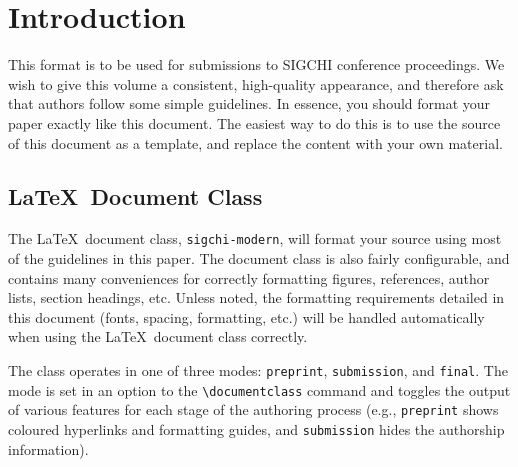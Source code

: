 \documentclass[preprint]{../latex/sigchi-modern}
\begin{document}
\maketitle

\begin{abstract}
This paper describes the formatting requirements for SIGCHI Conference
Proceedings and a few recommendations on writing for the worldwide SIGCHI
readership. This paper is also the documentation for the \LaTeX\ class
for producing formatted papers.
(This paper is not produced by SIGCHI, nor is it an authoritative source for
the described formatting.)
\end{abstract}



\section{Introduction}
This format is to be used for submissions to SIGCHI conference proceedings. We
wish to give this volume a consistent, high-quality appearance, and therefore
ask that authors follow some simple guidelines. In essence, you should format
your paper exactly like this document. The easiest way to do this is to use the
source of this document as a template, and replace the content with your own
material.

\subsection{\LaTeX\ Document Class}
The \LaTeX\ document class, \texttt{sigchi-modern}, will format your source
using most of the guidelines in this paper. The document class is also fairly
configurable, and contains many conveniences for correctly formatting figures,
references, author lists, section headings, etc. Unless noted, the formatting
requirements detailed in this document (fonts, spacing, formatting, etc.) will
be handled automatically when using the \LaTeX\ document class correctly.

The class operates in one of three modes: \texttt{preprint},
\texttt{sub\-mis\-sion}, and \texttt{final}. The mode is set in an option to the
\texttt{\textbackslash documentclass} command and toggles the output of various
features for each stage of the authoring process (e.g., \texttt{preprint} shows
coloured hyperlinks and formatting guides, and \texttt{submission} hides the
authorship information).
\end{document}
